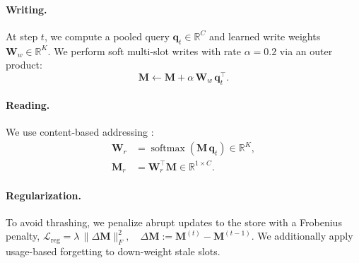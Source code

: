 \paragraph{Writing.}
At step $t$, we compute a pooled query $\mathbf{q}_t\in\mathbb{R}^{C}$ and learned write weights $\mathbf{W}_w\in\mathbb{R}^{K}$. We perform soft multi-slot writes with rate $\alpha{=}0.2$ via an outer product:
\begin{equation}
\mathbf{M} \leftarrow \mathbf{M} + \alpha\, \mathbf{W}_w \,\mathbf{q}_t^{\top}.
\label{eq:mem_write}
\end{equation}

\paragraph{Reading.}
We use content-based addressing \citep{graves-dynamicexternalmemory-2016}:
\begin{equation}
\begin{aligned}
\mathbf{W}_r &= \operatorname{softmax}(\mathbf{M}\,\mathbf{q}_t)\in\mathbb{R}^{K},\\
\mathbf{M}_r &= \mathbf{W}_r^{\top}\mathbf{M}\in\mathbb{R}^{1\times C}.
\end{aligned}
\label{eq:mem_read}
\end{equation}

\paragraph{Regularization.}
To avoid thrashing, we penalize abrupt updates to the store with a Frobenius penalty,
$
\mathcal{L}_{\mathrm{reg}} = \lambda \,\big\lVert \Delta\mathbf{M}\big\rVert_{F}^{2},
\quad
\Delta\mathbf{M} := \mathbf{M}^{(t)} - \mathbf{M}^{(t-1)}.
\label{eq:mem_reg}
$
We additionally apply usage-based forgetting to down-weight stale slots.


